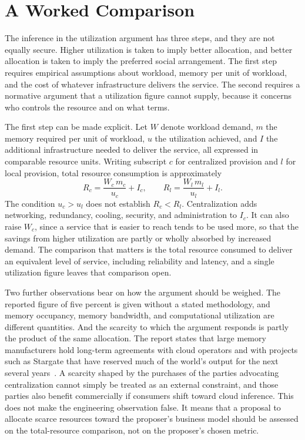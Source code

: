 \section{A Worked Comparison}

The inference in the utilization argument has three steps, and they are not equally secure. Higher utilization is taken to imply better allocation, and better allocation is taken to imply the preferred social arrangement. The first step requires empirical assumptions about workload, memory per unit of workload, and the cost of whatever infrastructure delivers the service. The second requires a normative argument that a utilization figure cannot supply, because it concerns who controls the resource and on what terms.

The first step can be made explicit. Let $W$ denote workload demand, $m$ the memory required per unit of workload, $u$ the utilization achieved, and $I$ the additional infrastructure needed to deliver the service, all expressed in comparable resource units. Writing subscript $c$ for centralized provision and $l$ for local provision, total resource consumption is approximately
\[
R_c=\frac{W_c\,m_c}{u_c}+I_c,\qquad
R_l=\frac{W_l\,m_l}{u_l}+I_l.
\]
The condition $u_c>u_l$ does not establish $R_c<R_l$. Centralization adds networking, redundancy, cooling, security, and administration to $I_c$. It can also raise $W_c$, since a service that is easier to reach tends to be used more, so that the savings from higher utilization are partly or wholly absorbed by increased demand. The comparison that matters is the total resource consumed to deliver an equivalent level of service, including reliability and latency, and a single utilization figure leaves that comparison open.

Two further observations bear on how the argument should be weighed. The reported figure of five percent is given without a stated methodology, and memory occupancy, memory bandwidth, and computational utilization are different quantities. And the scarcity to which the argument responds is partly the product of the same allocation. The report states that large memory manufacturers hold long-term agreements with cloud operators and with projects such as Stargate that have reserved much of the world's output for the next several years~\cite{bonifield2026}. A scarcity shaped by the purchases of the parties advocating centralization cannot simply be treated as an external constraint, and those parties also benefit commercially if consumers shift toward cloud inference. This does not make the engineering observation false. It means that a proposal to allocate scarce resources toward the proposer's business model should be assessed on the total-resource comparison, not on the proposer's chosen metric.


